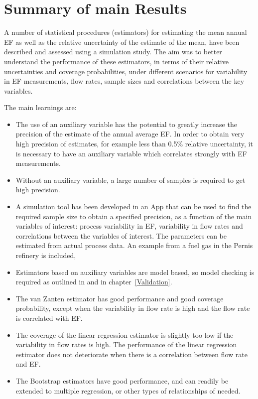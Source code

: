\clearpage
\section{Summary of main Results}\label{Discussion}
A number of statistical procedures (estimators) for estimating the mean annual EF as well as the relative uncertainty of the estimate of the mean, have been described and assessed using a simulation study. The aim was to better understand the performance of these estimators, in terms of their relative uncertainties and coverage probabilities, under different scenarios for variability in EF measurements, flow rates, sample sizes and correlations between the key variables.

The main learnings are:
\begin{itemize}
	\item The use of an auxiliary variable has the potential to greatly increase the precision of the estimate of the annual average EF. In order to obtain very high precision of estimates, for example less than 0.5\% relative uncertainty, it is necessary to have an auxiliary variable which correlates strongly with EF measurements.
	\item Without an auxiliary variable, a large number of samples is required to get high precision.
	\item A simulation tool has been developed in an App that can be used to find the required sample size to obtain a specified precision, as a function of the main variables of interest: process variability in EF, variability in flow rates and correlations between the variables of interest. The parameters can be estimated from actual process data. An example from a fuel gas in the Pernis refinery is included,
	\item Estimators based on auxiliary variables are model based, so model checking is required as outlined in \citet{vanZanten} and in chapter~\ref{Validation}.
	\item The van Zanten estimator has good performance and good coverage probability, except when the variability in flow rate is high and the flow rate is correlated with EF.
	\item The coverage of the linear regression estimator is slightly too low if the variability in flow rates is high. The performance of the linear regression estimator does not deteriorate when there is a correlation between flow rate and EF.
	\item The Bootstrap estimators have good performance, and can readily be extended to multiple regression, or other types of relationships of needed.

\end{itemize}
